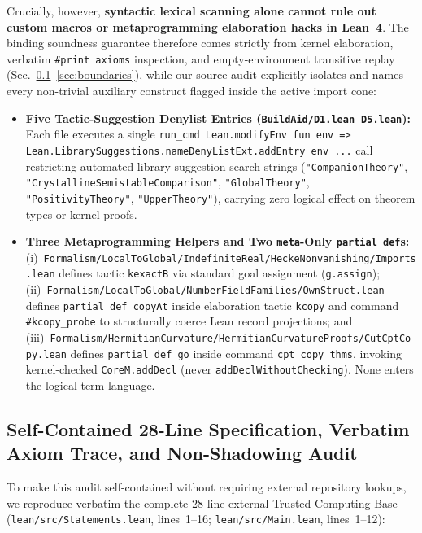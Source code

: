 \documentclass[11pt,a4paper]{article}
\newcommand{\code}[1]{\texttt{\small #1}}
\begin{document}
Crucially, however, \textbf{syntactic lexical scanning alone cannot rule out custom macros or metaprogramming elaboration hacks in Lean~4}. The binding soundness guarantee therefore comes strictly from kernel elaboration, verbatim \texttt{\#print axioms} inspection, and empty-environment transitive replay (Sec.~\ref{sec:tcb_verbatim}--\ref{sec:boundaries}), while our source audit explicitly isolates and names every non-trivial auxiliary construct flagged inside the active import cone:
\begin{itemize}
  \item \textbf{Five Tactic-Suggestion Denylist Entries (\texttt{BuildAid/D1.lean}--\texttt{D5.lean}):} Each file executes a single \code{run\_cmd Lean.modifyEnv fun env => Lean.LibrarySuggestions.\allowbreak nameDenyListExt.\allowbreak addEntry env ...} call restricting automated library-suggestion search strings (\texttt{"CompanionTheory"}, \code{"Crystalline\allowbreak Semistable\allowbreak Comparison"}, \texttt{"GlobalTheory"}, \texttt{"PositivityTheory"}, \texttt{"UpperTheory"}), carrying zero logical effect on theorem types or kernel proofs.
  \item \textbf{Three Metaprogramming Helpers and Two \texttt{meta}-Only \texttt{partial def}s:} (i)~\code{Formalism/\allowbreak LocalToGlobal/\allowbreak IndefiniteReal/\allowbreak Hecke\allowbreak Nonvanishing/\allowbreak Imports.lean} defines tactic \texttt{kexactB} via standard goal assignment (\texttt{g.assign}); (ii)~\code{Formalism/\allowbreak LocalToGlobal/\allowbreak NumberField\allowbreak Families/\allowbreak OwnStruct.lean} defines \texttt{partial def copyAt} inside elaboration tactic \texttt{kcopy} and command \texttt{\#kcopy\_probe} to structurally coerce Lean record projections; and (iii)~\code{Formalism/\allowbreak Hermitian\allowbreak Curvature/\allowbreak Hermitian\allowbreak CurvatureProofs/\allowbreak CutCptCopy.lean} defines \texttt{partial def go} inside command \code{cpt\_\allowbreak copy\_thms}, invoking kernel-checked \texttt{CoreM.addDecl} (never \texttt{addDeclWithoutChecking}). None enters the logical term language.
\end{itemize}

\subsection{Self-Contained 28-Line Specification, Verbatim Axiom Trace, and Non-Shadowing Audit}
\label{sec:tcb_verbatim}

To make this audit self-contained without requiring external repository lookups, we reproduce verbatim the complete 28-line external Trusted Computing Base (\texttt{lean/src/Statements.lean}, lines~1--16; \texttt{lean/src/Main.lean}, lines~1--12):
\end{document}
